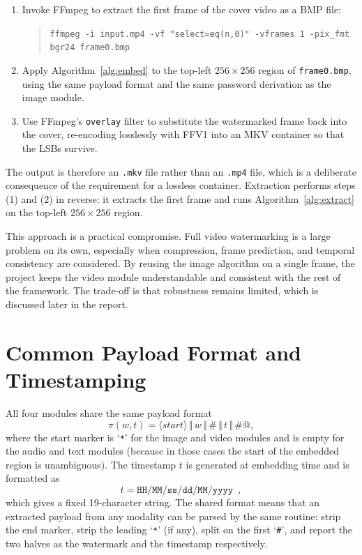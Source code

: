 \begin{enumerate}[label=(\arabic*)]
    \item Invoke FFmpeg to extract the first frame of the cover video as a BMP file:
    \begin{quote}
        \texttt{ffmpeg -i input.mp4 -vf "select=eq(n,0)" -vframes 1 -pix\_fmt bgr24 frame0.bmp}
    \end{quote}
    \item Apply Algorithm~\ref{alg:embed} to the top-left $256 \times 256$ region of \texttt{frame0.bmp}, using the same payload format and the same password derivation as the image module.
    \item Use FFmpeg's \texttt{overlay} filter to substitute the watermarked frame back into the cover, re-encoding losslessly with FFV1 into an MKV container so that the LSBs survive.
\end{enumerate}

The output is therefore an \texttt{.mkv} file rather than an \texttt{.mp4} file, which is a deliberate consequence of the requirement for a lossless container. Extraction performs steps (1) and (2) in reverse: it extracts the first frame and runs Algorithm~\ref{alg:extract} on the top-left $256 \times 256$ region.

This approach is a practical compromise. Full video watermarking is a large problem on its own, especially when compression, frame prediction, and temporal consistency are considered. By reusing the image algorithm on a single frame, the project keeps the video module understandable and consistent with the rest of the framework. The trade-off is that robustness remains limited, which is discussed later in the report.

\section{Common Payload Format and Timestamping}
\label{sec:payload_format}

All four modules share the same payload format
\[
    \pi(w, t) = \langle\textit{start}\rangle \,\Vert\, w \,\Vert\, \texttt{\#} \,\Vert\, t \,\Vert\, \texttt{\#@},
\]
where the start marker is `\texttt{*}' for the image and video modules and is empty for the audio and text modules (because in those cases the start of the embedded region is unambiguous). The timestamp $t$ is generated at embedding time and is formatted as
\[
    t = \texttt{HH/MM/ss/dd/MM/yyyy} \enspace ,
\]
which gives a fixed 19-character string. The shared format means that an extracted payload from any modality can be parsed by the same routine: strip the end marker, strip the leading `\texttt{*}' (if any), split on the first `\texttt{\#}', and report the two halves as the watermark and the timestamp respectively.

